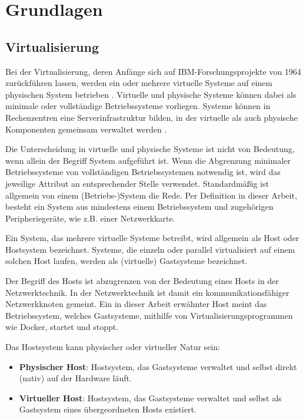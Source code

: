 \documentclass[../main.tex]{subfiles}
\begin{document}
\chapter{Grundlagen}
\label{basics}

	\section{Virtualisierung}
  \label{introVirt}
    Bei der Virtualisierung, deren Anfänge sich auf IBM-Forschungsprojekte von 1964 zurückführen lassen, werden ein oder mehrere virtuelle Systeme auf einem physischen System betrieben \cite[S.8]{advancedServerVirt}. Virtuelle und physische Systeme können dabei als minimale oder vollständige Betriebssysteme vorliegen. Systeme können in Rechenzentren eine Serverinfrastruktur bilden, in der virtuelle als auch physische Komponenten gemeinsam verwaltet werden \cite[S.661]{tanenbaumOS}.

		Die Unterscheidung in virtuelle und physische Systeme ist nicht von Bedeutung, wenn allein der Begriff \glqq{}System\grqq{} aufgeführt ist. Wenn die Abgrenzung minimaler Betriebssysteme von vollständigen Betriebssystemen notwendig ist, wird das jeweilige Attribut an entsprechender Stelle verwendet. Standardmäßig ist allgemein von einem (Betriebs-)System die Rede. Per Definition in dieser Arbeit, besteht ein System aus mindestens einem Betriebssystem und zugehörigen Peripheriegeräte, wie z.B. einer Netzwerkkarte.

		Ein System, das mehrere virtuelle Systeme betreibt, wird allgemein als Host oder Hostsystem bezeichnet. Systeme, die einzeln oder parallel virtualisiert auf einem solchen Host laufen, werden als (virtuelle) Gastsysteme bezeichnet.

		Der Begriff des Hosts ist abzugrenzen von der Bedeutung eines Hosts in der Netzwerktechnik. In der Netzwerktechnik ist damit ein kommunikationsfähiger Netzwerkknoten gemeint. Ein in dieser Arbeit erwähnter Host meint das Betriebssystem, welches Gastsysteme, mithilfe von Virtualisierungsprogrammen wie Docker, startet und stoppt.

		Das Hostsystem kann physischer oder virtueller Natur sein:
		\begin{itemize}
			\item \textbf{Physischer Host}: Hostsystem, das Gastsysteme verwaltet und selbst direkt (nativ) auf der Hardware läuft.
			\item \textbf{Virtueller Host}: Hostsystem, das Gastsysteme verwaltet und selbst als Gastsystem eines übergeordneten Hosts existiert.
		\end{itemize}
\end{document}

